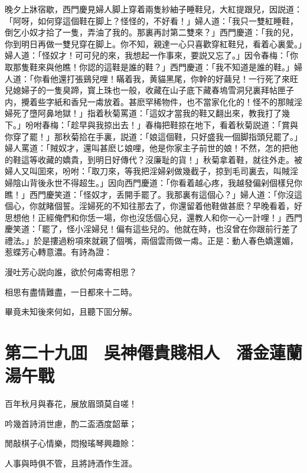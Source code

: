 晚夕上牀宿歇，西門慶見婦人脚上穿着兩隻紗紬子睡鞋兒，大紅提跟兒，因説道：「阿呀，如何穿這個鞋在脚上？怪怪的，不好看！」婦人道：「我只一雙紅睡鞋，倒乞小奴才拾了一隻，弄油了我的。那裏再討第二雙來？」西門慶道：「我的兒，你到明日再做一雙兒穿在脚上。你不知，親達一心只喜歡穿紅鞋兒，看着心裏愛。」婦人道：「怪奴才！可可兒的來，我想起一作事來，要説又忘了。」因令春梅：「你取那隻鞋來與他瞧！你認的這鞋是誰的鞋？」西門慶道：「我不知道是誰的鞋。」婦人道：「你看他還打張鷄兒哩！瞞着我，黄貓黑尾，你幹的好繭兒！一行死了來旺兒媳婦子的一隻臭蹄，寳上珠也一般，收藏在山子底下藏春塢雪洞兒裏拜帖匣子内，攪着些字紙和香兒一䖏放着。甚麽罕稀物件，也不當家化化的！怪不的那賊淫婦死了墮阿鼻地獄！」指着秋菊罵道：「這奴才當我的鞋又翻出來，教我打了幾下。」吩咐春梅：「趁早與我掠出去！」春梅把鞋掠在地下，看着秋菊説道：「賞與你穿了罷！」那秋菊拾在手裏，説道：「娘這個鞋，只好盛我一個脚指頭兒罷了。」婦人罵道：「賊奴才，還叫甚麽じ娘哩，他是你家主子前世的娘！不然，怎的把他的鞋這等收藏的嬌貴，到明日好傳代？沒廉耻的貨！」秋菊拿着鞋，就往外走。被婦人又叫囬來，吩咐：「取刀來，等我把淫婦剁做幾截子，掠到毛司裏去，叫賊淫婦陰山背後永世不得超生。」因向西門慶道：「你看着越心疼，我越發偏剁個樣兒你瞧！」西門慶笑道：「怪奴才，丢開手罷了。我那裏有這個心？」婦人道：「你沒這個心，你就睹個誓。淫婦死的不知往那去了，你還留着他鞋做甚麽？早晚看着，好思想他！正經俺們和你恁一場，你也沒恁個心兒，還教人和你一心一計哩！」西門慶笑道：「罷了，怪小淫婦兒！偏有這些兒的。他就在時，也沒曾在你跟前行差了禮法。」於是摟過粉項來就親了個嘴，兩個雲雨做一䖏。正是：動人春色嬌還媚，惹蝶芳心轉意濃。有詩為證：

漫吐芳心説向誰，欲於何䖏寄相思？

相思有盡情難盡，一日都來十二時。

畢竟未知後來何如，且聽下囬分解。

\chapter*{第二十九囬　吳神僊貴賤相人　潘金蓮蘭湯午戰}

百年秋月與春花，展放眉頭莫自嗟！

吟幾首詩消世慮，酌二盃酒度韶華；

閒敲棋子心情樂，悶撥瑤琴興趣賒：

人事與時俱不管，且將詩酒作生涯。


